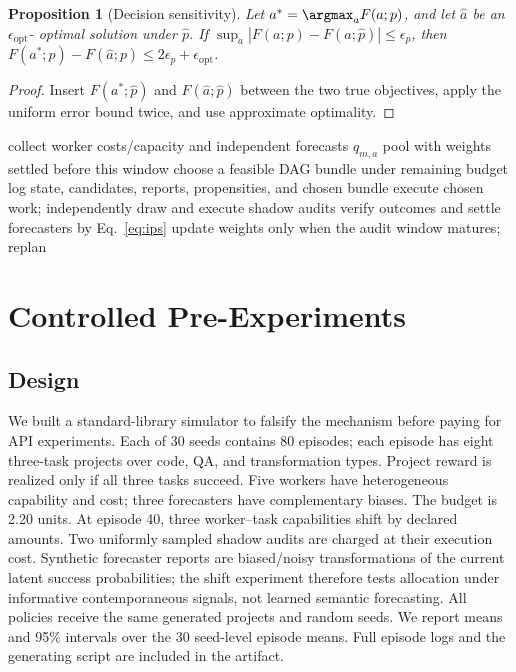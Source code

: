 \documentclass[sigconf,anonymous,review]{acmart}
\newtheorem{proposition}{Proposition}
\newcommand{\calms}{\textsc{Calm-S}}
\begin{document}
\begin{proposition}[Decision sensitivity]\label{prop:regret}
Let $a^*=\argmax_a F(a;p)$, and let $\hat a$ be an $\epsilon_{\mathrm{opt}}$-
optimal solution under $\hat p$. If
$\sup_a|F(a;p)-F(a;\hat p)|\le\epsilon_p$, then
$F(a^*;p)-F(\hat a;p)\le2\epsilon_p+\epsilon_{\mathrm{opt}}$.
\end{proposition}
\begin{proof}
Insert $F(a^*;\hat p)$ and $F(\hat a;\hat p)$ between the two true objectives,
apply the uniform error bound twice, and use approximate optimality.
\end{proof}

\begin{algorithm}[t]
\caption{One \calms{} decision window}\label{alg:calm}
\begin{algorithmic}[1]
\State collect worker costs/capacity and independent forecasts $q_{m,a}$
\State pool with weights settled before this window
\State choose a feasible DAG bundle under remaining budget
\State log state, candidates, reports, propensities, and chosen bundle
\State execute chosen work; independently draw and execute shadow audits
\State verify outcomes and settle forecasters by Eq.~\eqref{eq:ips}
\State update weights only when the audit window matures; replan
\end{algorithmic}
\end{algorithm}

\section{Controlled Pre-Experiments}\label{sec:pre}

\subsection{Design}

We built a standard-library simulator to falsify the mechanism before paying for
API experiments. Each of 30 seeds contains 80 episodes; each episode has eight
three-task projects over code, QA, and transformation types. Project reward is
realized only if all three tasks succeed. Five workers have heterogeneous
capability and cost; three forecasters have complementary biases. The budget is
2.20 units. At episode 40, three worker--task capabilities shift by declared
amounts. Two uniformly sampled shadow audits are charged at their execution cost.
Synthetic forecaster reports are biased/noisy transformations of the current
latent success probabilities; the shift experiment therefore tests allocation
under informative contemporaneous signals, not learned semantic forecasting.
All policies receive the same generated projects and random seeds. We report
means and 95\% intervals over the 30 seed-level episode means. Full episode logs
and the generating script are included in the artifact.
\end{document}
